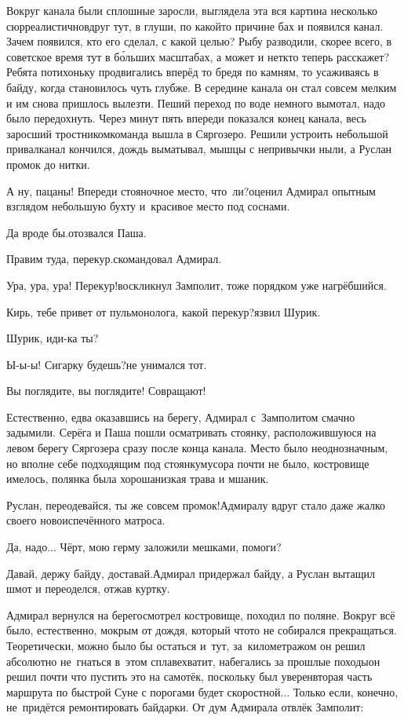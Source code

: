 Вокруг канала были сплошные заросли, выглядела эта вся картина несколько сюрреалистично\mdash вдруг тут, в глуши, по какой\sdash то причине бах и появился канал. Зачем появился, кто его сделал, с какой целью? Рыбу разводили, скорее всего, в советское время тут в б\'{о}льших масштабах, а может и нет\mdash кто теперь расскажет? Ребята потихоньку продвигались вперёд то бредя по камням, то усаживаясь в байду, когда становилось чуть глубже. В середине канала он стал совсем мелким и им снова пришлось вылезти. Пеший переход по воде немного вымотал, надо было передохнуть. Через минут пять впереди показался конец канала, весь заросший тростником\mdash команда вышла в Сяргозеро. Решили устроить небольшой привал\mdash канал кончился, дождь выматывал, мышцы с непривычки ныли, а Руслан промок до нитки.

\diagdash А ну, пацаны! Впереди стояночное место, что~ли?\mdash оценил Адмирал опытным взглядом небольшую бухту и~красивое место под соснами.

\diagdash Да вроде бы.\mdash отозвался Паша.

\diagdash Правим туда, перекур.\mdash скомандовал Адмирал. 

\diagdash Ура, ура, ура! Перекур!\mdash воскликнул Замполит, тоже порядком уже нагрёбшийся.

\diagdash Кирь, тебе привет от пульмонолога, какой перекур?\mdash язвил Шурик.

\diagdash Шурик, иди-ка ты?

\diagdash Ы-ы-ы! Сигарку будешь?\mdash не унимался тот.

\diagdash Вы поглядите, вы поглядите! Совращают!

Естественно, едва оказавшись на берегу, Адмирал с~Замполитом смачно задымили. Серёга и Паша пошли осматривать стоянку, расположившуюся на левом берегу Сяргозера сразу после конца канала. Место было неоднозначным, но вполне себе подходящим под стоянку\mdash мусора почти не было, костровище имелось, полянка была хороша\mdash низкая трава и мшаник.

\diagdash Руслан, переодевайся, ты же совсем промок!\mdash Адмиралу вдруг стало даже жалко своего новоиспечённого матроса. 

\diagdash Да, надо$\ldots$ Чёрт, мою герму заложили мешками, помоги?

\diagdash Давай, держу байду, доставай.\mdash Адмирал придержал байду, а Руслан вытащил шмот и переоделся, отжав куртку. 

Адмирал вернулся на берег\mdash осмотрел костровище, походил по поляне. Вокруг всё было, естественно, мокрым от дождя, который что\sdash то не собирался прекращаться. Теоретически, можно было бы остаться и~тут, за~километражом он решил абсолютно не~гнаться в~этом сплаве\mdash хватит, набегались за прошлые походы\mdash он решил почти что пустить это на самотёк, поскольку был уверен\mdash вторая часть маршрута по быстрой Суне с порогами будет скоростной$\ldots$ Только если, конечно, не~придётся ремонтировать байдарки. От дум Адмирала отвлёк Замполит:

